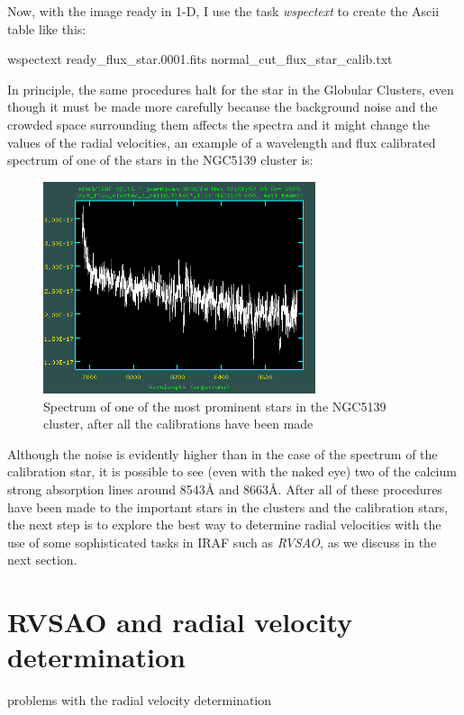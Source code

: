 Now, with the image ready in 1-D, I use the task \textit{wspectext} to create the Ascii table like this:

\begin{center}
wspectext ready\_flux\_star.0001.fits normal\_cut\_flux\_star\_calib.txt
\end{center}

In principle, the same procedures halt for the star in the Globular Clusters, even though it must be made more carefully because the background noise and the crowded space surrounding them affects the spectra and it might change the values of the radial velocities, an example of a wavelength and flux calibrated spectrum of one of the stars in the NGC5139 cluster is:

\begin{figure}[H]
\centering
\includegraphics[width=8cm]{images/cluster_star_flux.png}
\caption[Spectrum of a prominent star of the NGC5139 globular cluster]{Spectrum of one of the most prominent stars in the NGC5139 cluster, after all the calibrations have been made}
\end{figure}

Although the noise is evidently higher than in the case of the spectrum of the calibration star, it is possible to see (even with the naked eye) two of the calcium strong absorption lines around 8543\AA$ $ and 8663\AA. After all of these procedures have been made to the important stars in the clusters and the calibration stars, the next step is to explore the best way to determine radial velocities with the use of some sophisticated tasks in IRAF such as \textit{RVSAO}, as we discuss in the next section. 

\section{RVSAO and radial velocity determination}

problems with the radial velocity determination

